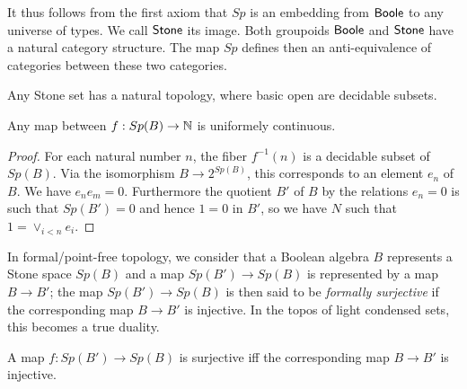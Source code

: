 %

It thus follows from the first axiom that $Sp$ is an embedding from $\mathsf{Boole}$ to any universe of types. We call
$\mathsf{Stone}$ its image. Both groupoids $\mathsf{Boole}$ and $\mathsf{Stone}$ have a natural category structure.
The map $Sp$ defines then an anti-equivalence of categories between these two categories.


Any Stone set has a natural topology, where basic open are decidable subsets.

\medskip

\begin{proposition}
Any map between $f: Sp(B)\rightarrow\mathbb{N}$ is uniformely continuous.
\end{proposition}  

\begin{proof}
  For each natural number $n$, the fiber $f^{-1}(n)$ is a decidable
  subset of $Sp(B)$. Via the isomorphism $B\rightarrow 2^{Sp(B)}$, this corresponds to an element $e_n$ of $B$. We have
  $e_ne_m = 0$. Furthermore the quotient $B'$ of $B$ by the relations $e_n = 0$ is such that $Sp(B') = 0$ and hence
  $1 = 0$ in $B'$, so we have $N$ such that $1 = \vee_{i<n}e_i$.
\end{proof}

\medskip

In formal/point-free topology, we consider that a Boolean algebra $B$ represents a Stone space $Sp(B)$ and a map
$Sp(B') \to Sp(B)$ is represented by a map $B\rightarrow B'$; the map $Sp(B')\to Sp(B)$ is then said to be
{\em formally surjective} if the corresponding map $B\to B'$ is injective. In the topos of light condensed sets,
this becomes a true duality.

\begin{axiom}
  A map $f:Sp(B')\to Sp(B)$ is surjective iff the corresponding map $B \to B'$ is injective.
\end{axiom} 

